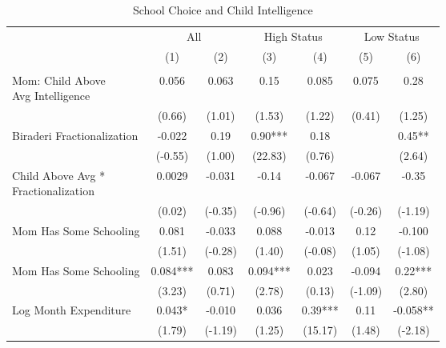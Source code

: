 \begin{table}[htbp]\centering
\def\sym#1{\ifmmode^{#1}\else\(^{#1}\)\fi}
\caption{School Choice and Child Intelligence\label{hhselectioninteraction}}
\begin{tabular}{l*{6}{c}}
\hline\hline
                &\multicolumn{2}{c}{All}  &\multicolumn{2}{c}{High Status}&\multicolumn{2}{c}{Low Status}\\\cmidrule(lr){2-3}\cmidrule(lr){4-5}\cmidrule(lr){6-7}
                &\multicolumn{1}{c}{(1)}&\multicolumn{1}{c}{(2)}&\multicolumn{1}{c}{(3)}&\multicolumn{1}{c}{(4)}&\multicolumn{1}{c}{(5)}&\multicolumn{1}{c}{(6)}\\
                &\multicolumn{1}{c}{}&\multicolumn{1}{c}{}&\multicolumn{1}{c}{}&\multicolumn{1}{c}{}&\multicolumn{1}{c}{}&\multicolumn{1}{c}{}\\
\hline
\specialcell{Mom: Child Above\\Avg Intelligence}&    0.056   &    0.063   &     0.15   &    0.085   &    0.075   &     0.28   \\
                &   (0.66)   &   (1.01)   &   (1.53)   &   (1.22)   &   (0.41)   &   (1.25)   \\
Biraderi Fractionalization&   -0.022   &     0.19   &     0.90***&     0.18   &            &     0.45** \\
                &  (-0.55)   &   (1.00)   &  (22.83)   &   (0.76)   &            &   (2.64)   \\
\specialcell{Child Above Avg *\\Fractionalization}&   0.0029   &   -0.031   &    -0.14   &   -0.067   &   -0.067   &    -0.35   \\
                &   (0.02)   &  (-0.35)   &  (-0.96)   &  (-0.64)   &  (-0.26)   &  (-1.19)   \\
Mom Has Some Schooling&    0.081   &   -0.033   &    0.088   &   -0.013   &     0.12   &   -0.100   \\
                &   (1.51)   &  (-0.28)   &   (1.40)   &  (-0.08)   &   (1.05)   &  (-1.08)   \\
Mom Has Some Schooling&    0.084***&    0.083   &    0.094***&    0.023   &   -0.094   &     0.22***\\
                &   (3.23)   &   (0.71)   &   (2.78)   &   (0.13)   &  (-1.09)   &   (2.80)   \\
Log Month Expenditure&    0.043*  &   -0.010   &    0.036   &     0.39***&     0.11   &   -0.058** \\
                &   (1.79)   &  (-1.19)   &   (1.25)   &  (15.17)   &   (1.48)   &  (-2.18)   \\

\end{tabular}
\end{table}
